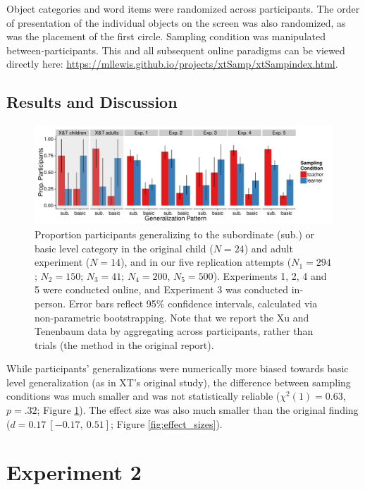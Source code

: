 \documentclass[man]{apa2}
\begin{document}
Object categories and word items were randomized across participants. The order of presentation of the individual objects on the screen was also randomized, as was the placement of the first circle. Sampling condition was manipulated between-participants. This and all subsequent online paradigms can be viewed directly here: \url{https://mllewis.github.io/projects/xtSamp/xtSampindex.html}.

\subsection{Results and Discussion}

 \begin{figure} [t]
 \begin{center} 
 \includegraphics[width=6.2in]{figures/FIG_2.pdf} 
 \caption{\label{fig:bar_plots} Proportion participants generalizing to the subordinate (sub.) or basic level category in the original child ($N = 24$) and adult experiment ($N = 14$), and in our five replication attempts ($N_{1} = 294$; $N_{2} = 150$; $N_{3} = 41$; $N_{4} = 200$, $N_{5} = 500$). Experiments 1, 2, 4 and 5 were conducted online, and Experiment 3 was conducted in-person. Error bars reflect 95\% confidence intervals, calculated via non-parametric bootstrapping. Note that we report the Xu and Tenenbaum data by aggregating across participants, rather than trials (the method in the original report).} 
 \end{center} 
\end{figure}

While participants' generalizations were numerically more biased towards basic level generalization (as in XT's original study), the difference between sampling conditions was much smaller and was not statistically reliable ($\chi^2(1) = 0.63$, $p = .32$; Figure \ref{fig:bar_plots}). The effect size was also much smaller than the original finding ($d = 0.17\ [-0.17,\ 0.51]$; Figure \ref{fig:effect_sizes}).

\section{Experiment 2}
\end{document}
